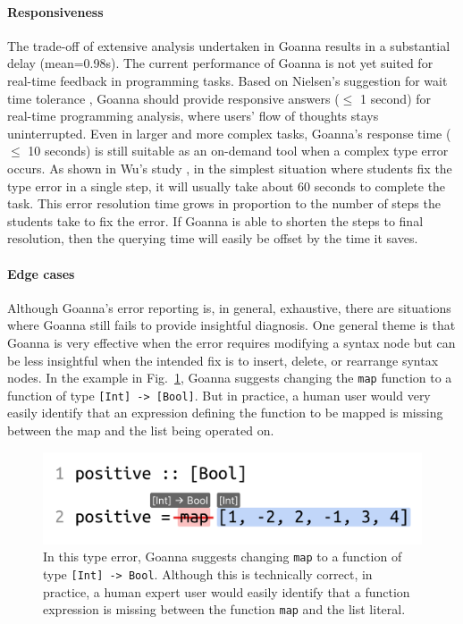     \paragraph{\textbf{Responsiveness}}
    The trade-off of extensive analysis undertaken in Goanna results in a substantial delay (mean=0.98s).
    The current performance of Goanna is not yet suited for real-time feedback in programming tasks. Based on Nielsen's suggestion for wait time tolerance \cite{Ferdowsi2023-au}, Goanna should provide responsive answers ($\leq$ 1 second) for real-time programming analysis, where users' flow of thoughts stays uninterrupted. Even in larger and more complex tasks, Goanna's response time ($\leq$ 10 seconds) is still suitable as an on-demand tool when a complex type error occurs. As shown in Wu's study \cite{Wu2017-eb}, in the simplest situation where students fix the type error in a single step, it will usually take about 60 seconds to complete the task. This error resolution time grows in proportion to the number of steps the students take to fix the error. If Goanna is able to shorten the steps to final resolution, then the querying time will easily be offset by the time it saves.

    \paragraph{\textbf{Edge cases}} \label{sec:edge-case}
    Although Goanna's error reporting is, in general, exhaustive, there are situations where Goanna still fails to provide insightful diagnosis. One general theme is that Goanna is very effective when the error requires modifying a syntax node but can be less insightful when the intended fix is to insert, delete, or rearrange syntax nodes. In the example in Fig.~\ref{fig:weakness}, Goanna suggests changing the \texttt{map} function to a function of type \texttt{[Int] -> [Bool]}. But in practice, a human user would very easily identify that an expression defining the function to be mapped is missing between the map and the list being operated on.
    
        \begin{figure}[ht!]
        \centering
        \includegraphics[width=0.6\linewidth]{images/Weakness}
        \caption[Edge cases in Goanna]{\textbf{} In this type error, Goanna suggests changing \texttt{map} to a function of type \texttt{[Int] -> Bool}. Although this is technically correct, in practice, a human expert user would easily identify that a function expression is missing between the function \texttt{map} and the list literal.}
        \label{fig:weakness}
    \end{figure}

